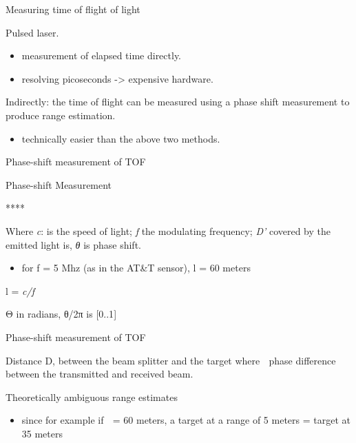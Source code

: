 \documentclass[compress]{beamer}
\providecommand{\tightlist}{%
  \setlength{\itemsep}{0pt}\setlength{\parskip}{0pt}}
\begin{document}
\begin{frame}{Measuring time of flight of light}

Pulsed laser.

\begin{itemize}
\tightlist
\item
  measurement of elapsed time directly.
\item
  resolving picoseconds -\textgreater{} expensive hardware.
\end{itemize}

Indirectly: the time of flight can be measured using a phase shift
measurement to produce range estimation.

\begin{itemize}
\tightlist
\item
  technically easier than the above two methods.
\end{itemize}

\end{frame}

\begin{frame}{Phase-shift measurement of TOF}

Phase-shift Measurement

\end{frame}

\begin{frame}{****}

\end{frame}

\begin{frame}{Where \emph{c}: is the speed of light; \emph{f} the
modulating frequency; \emph{D'} covered by the emitted light is,
\emph{θ} is phase shift.}

\begin{itemize}
\tightlist
\item
  for f = 5 Mhz (as in the AT\&T sensor), l = 60 meters
\end{itemize}

l = \emph{c/f}

Θ in radians, θ/2π is {[}0..1{]}

\end{frame}

\begin{frame}{Phase-shift measurement of TOF}

Distance D, between the beam splitter and the target where  phase
difference between the transmitted and received beam.

Theoretically ambiguous range estimates

\begin{itemize}
\tightlist
\item
  since for example if  = 60 meters, a target at a range of 5 meters =
  target at 35 meters
\end{itemize}

\end{frame}
\end{document}
